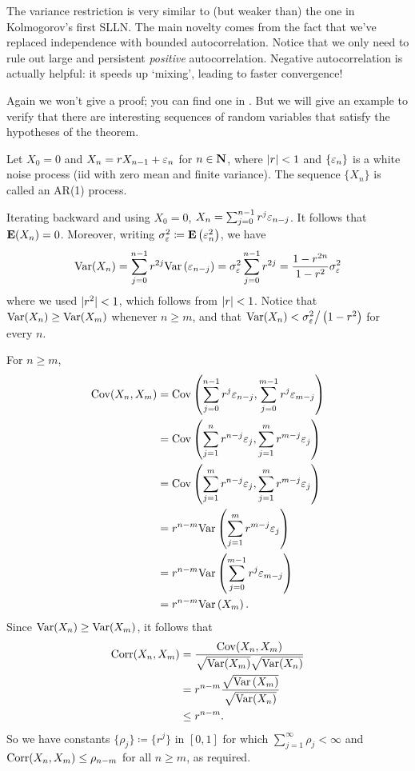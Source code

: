 \documentclass[11pt,letterpaper,reqno,oneside]{article}
\begin{document}
The variance restriction is very similar to (but weaker than) the one in Kolmogorov's first SLLN. The main novelty comes from the fact that we've replaced independence with bounded autocorrelation. Notice that we only need to rule out large and persistent \emph{positive} autocorrelation. Negative autocorrelation is actually helpful: it speeds up `mixing', leading to faster convergence!


Again we won't give a proof; you can find one in \textcite[][Corollary 2.2.1]{Serfling1970}. But we will give an example to verify that there are interesting sequences of random variables that satisfy the hypotheses of the theorem.
%
\begin{example}[AR(1) model]
	Let $X_0 = 0$ and $X_n = r X_{n-1} + \varepsilon_n$ for $n \in \mathbf{N}$, where $\lvert r\rvert < 1$ and $\{ \varepsilon_n \}$ is a white noise process (iid with zero mean and finite variance). The sequence $\{ X_n \}$ is called an AR(1) process.

	Iterating backward and using $X_0=0$, $X_n = \sum_{j=0}^{n-1} r^j \varepsilon_{n-j}$. It follows that $\mathbf{E}(X_n)=0$. Moreover, writing $\sigma^2_\varepsilon \coloneqq \mathbf{E}\left( \varepsilon_n^2 \right)$, we have
	\begin{equation*}
		\mathrm{Var}(X_n) 
		= \sum_{j=0}^{n-1} r^{2j} \mathrm{Var}\left( \varepsilon_{n-j} \right)
		= \sigma^2_\varepsilon \sum_{j=0}^{n-1} r^{2j}
		= \frac{ 1 - r^{2n} }{ 1 - r^2 } \sigma^2_\varepsilon 
	\end{equation*}
	where we used $\lvert r^2\rvert < 1$, which follows from $\lvert r\rvert < 1$. Notice that $\mathrm{Var}(X_n) \geq \mathrm{Var}(X_m)$ whenever $n \geq m$, and that $\mathrm{Var}(X_n) < \sigma^2_\varepsilon \big/ \left( 1 - r^2 \right)$ for every $n$.

	For $n \geq m$,
	\begin{align*}
		\mathrm{Cov}(X_n,X_m) 
		={}& \mathrm{Cov}\left( \sum_{j=0}^{n-1} r^j \varepsilon_{n-j}, \sum_{j=0}^{m-1} r^j \varepsilon_{m-j} \right)
		\\
		={}& \mathrm{Cov}\left( \sum_{j=1}^n r^{n-j} \varepsilon_j, \sum_{j=1}^m r^{m-j} \varepsilon_j \right)
		\\
		={}& \mathrm{Cov}\left( \sum_{j=1}^m r^{n-j} \varepsilon_j, \sum_{j=1}^m r^{m-j} \varepsilon_j \right)
		\\
		={}& r^{n-m} \mathrm{Var}\left( \sum_{j=1}^m r^{m-j} \varepsilon_j \right)
		\\
		={}& r^{n-m} \mathrm{Var}\left( \sum_{j=0}^{m-1} r^j \varepsilon_{m-j} \right)
		\\
		={}& r^{n-m} \mathrm{Var}\left( X_m \right) .
	\end{align*}
	Since $\mathrm{Var}(X_n) \geq \mathrm{Var}(X_m)$, it follows that
	\begin{align*}
		\mathrm{Corr}(X_n,X_m)
		={}& \frac{ \mathrm{Cov}(X_n,X_m) }{ \sqrt{\mathrm{Var}(X_m)} \sqrt{\mathrm{Var}(X_n)} }
		\\
		={}& r^{n-m} \frac{ \sqrt{\mathrm{Var}\left( X_m \right)} }{ \sqrt{\mathrm{Var}(X_n)} }
		\\
		\leq{}& r^{n-m} .
	\end{align*}
	So we have constants $\{ \rho_j \} \coloneqq \{ r^j \}$ in $[0,1]$ for which $\sum_{j=1}^\infty \rho_j < \infty$ and $\mathrm{Corr}(X_n,X_m) \leq \rho_{n-m}$ for all $n \geq m$, as required.


\end{example}
\end{document}
